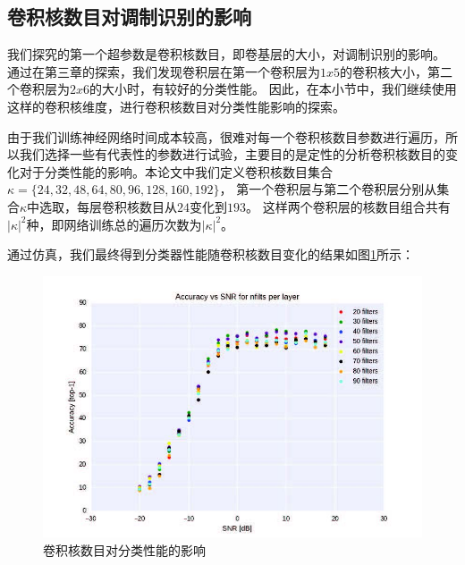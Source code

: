 \subsection{卷积核数目对调制识别的影响}
我们探究的第一个超参数是卷积核数目，即卷基层的大小，对调制识别的影响。
通过在第三章的探索，我们发现卷积层在第一个卷积层为$1x5$的卷积核大小，第二个卷积层为$2x6$的大小时，有较好的分类性能。
因此，在本小节中，我们继续使用这样的卷积核维度，进行卷积核数目对分类性能影响的探索。\par
由于我们训练神经网络时间成本较高，很难对每一个卷积核数目参数进行遍历，所以我们选择一些有代表性的参数进行试验，主要目的是定性的分析卷积核数目的变化对于分类性能的影响。本论文中我们定义卷积核数目集合$\kappa =\{24, 32, 48, 64, 80, 96, 128, 160, 192\}$，
第一个卷积层与第二个卷积层分别从集合$\kappa$中选取，每层卷积核数目从$24$变化到$193$。
这样两个卷积层的核数目组合共有$|\kappa|^2$种，即网络训练总的遍历次数为$|\kappa|^2$。\par
通过仿真，我们最终得到分类器性能随卷积核数目变化的结果如图\ref{sec:fig_5_1}所示：\par
\begin{figure}[!h]
	\centering
	\includegraphics[scale=1.1]{figures/chapter_5/fig_5_1}
	\caption{卷积核数目对分类性能的影响} \label{sec:fig_5_1}
\end{figure}

